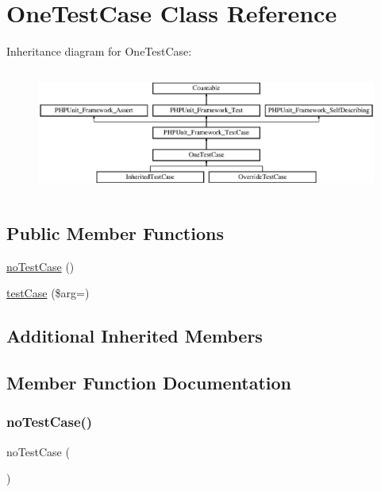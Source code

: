 \hypertarget{class_one_test_case}{}\section{One\+Test\+Case Class Reference}
\label{class_one_test_case}
Inheritance diagram for One\+Test\+Case\+:\begin{figure}[H]
\begin{center}
\leavevmode
\includegraphics[height=4.129793cm]{class_one_test_case}
\end{center}
\end{figure}
\subsection*{Public Member Functions}
\begin{DoxyCompactItemize}
\item 
\mbox{\hyperlink{class_one_test_case_aa65ee00540e2674f18afc5a43359fa08}{no\+Test\+Case}} ()
\item 
\mbox{\hyperlink{class_one_test_case_ad285be88191f34024fb8653fe642fdc2}{test\+Case}} (\$arg=\textquotesingle{}\textquotesingle{})
\end{DoxyCompactItemize}
\subsection*{Additional Inherited Members}


\subsection{Member Function Documentation}
\mbox{\label{class_one_test_case_aa65ee00540e2674f18afc5a43359fa08}} 
\subsubsection{\texorpdfstring{no\+Test\+Case()}{noTestCase()}}
{\footnotesize\ttfamily no\+Test\+Case (\begin{DoxyParamCaption}{ }\end{DoxyParamCaption})}

